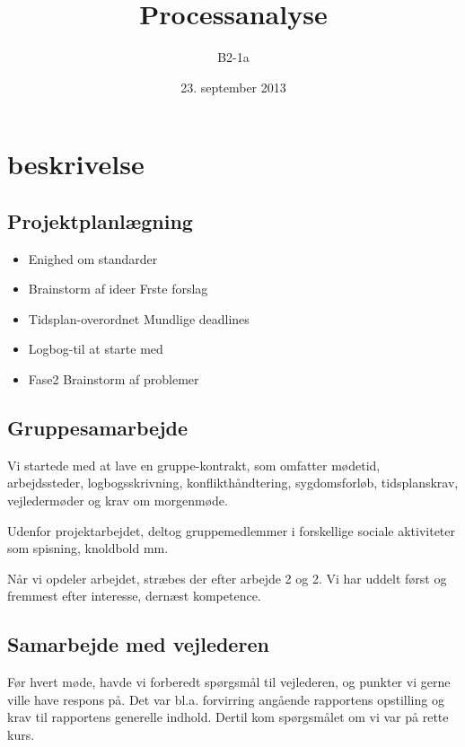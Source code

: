 


\title{Processanalyse}
\author{B2-1a}
\date{23. september 2013}
\maketitle

\section{beskrivelse}

\subsection{Projektplanlægning}
\begin{itemize}
\item Enighed om standarder
\item Brainstorm af ideer
\subitem Frste forslag
\item Tidsplan-overordnet
\subitem Mundlige deadlines
\item Logbog-til at starte med
\item Fase2 Brainstorm af problemer
\end{itemize}

\subsection{Gruppesamarbejde}


Vi startede med at lave en gruppe-kontrakt, som omfatter mødetid, arbejdssteder, logbogsskrivning, konflikthåndtering, sygdomsforløb, tidsplanskrav, vejledermøder og krav om morgenmøde.

Udenfor projektarbejdet, deltog gruppemedlemmer i forskellige sociale aktiviteter som spisning, knoldbold mm.

Når vi opdeler arbejdet, stræbes der efter arbejde 2 og 2. Vi har uddelt først og fremmest efter interesse, dernæst kompetence.

\subsection{Samarbejde med vejlederen}


Før hvert møde, havde vi forberedt spørgsmål til vejlederen, og punkter vi gerne ville have respons på. Det var bl.a. forvirring angående rapportens opstilling og krav til rapportens generelle indhold. Dertil kom spørgsmålet om vi var på rette kurs.


